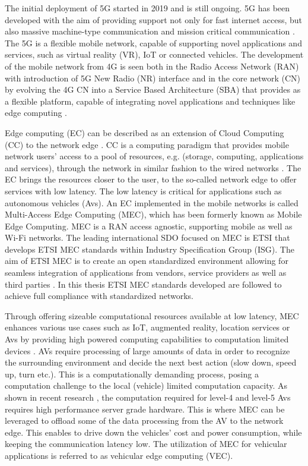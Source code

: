\documentclass[12pt,a4paper,twoside]{report}
\begin{document}
The initial deployment of 5G started in 2019 and is still ongoing. 5G has been developed with the aim of providing support not only for fast internet access, but also massive machine-type communication and mission critical communication \cite{dahlman-2020-5g}. The 5G is a flexible mobile network, capable of supporting novel applications and services, such as virtual reality (VR), IoT or connected vehicles. The development of the mobile network from 4G is seen both in the Radio Access Network (RAN) with introduction of 5G New Radio (NR) interface and in the core network (CN) by evolving the 4G CN into a Service Based Architecture (SBA) that provides as a flexible platform, capable of integrating novel applications and techniques like edge computing \cite{sabella-mec-sw-dev}. 

Edge computing (EC) can be described as an extension of Cloud Computing (CC) to the network edge \cite{sabella-mec-sw-dev}. CC is a computing paradigm that provides mobile network users’ access to a pool of resources, e.g. (storage, computing, applications and services), through the network in similar fashion to the wired networks \cite{mell2011nistCC}. The EC brings the resources closer to the user, to the so-called network edge to offer services with low latency. The low latency is critical for applications such as autonomous vehicles (Avs). An EC implemented in the mobile networks is called Multi-Access Edge Computing (MEC), which has been formerly known as Mobile Edge Computing. MEC is a RAN access agnostic, supporting mobile as well as Wi-Fi networks. The leading international SDO focused on MEC is ETSI that develops ETSI MEC standards within Industry Specification Group (ISG). The aim of ETSI MEC is to create an open standardized environment allowing for seamless integration of applications from vendors, service providers as well as third parties \cite{mec-etsi-web}. In this thesis ETSI MEC standards developed are followed to achieve full compliance with standardized networks. 

Through offering sizeable computational resources available at low latency, MEC enhances various use cases such as IoT, augmented reality, location services or Avs by providing high powered computing capabilities to computation limited devices \cite{mec-etsi-web}. AVs require processing of large amounts of data in order to recognize the surrounding environment and decide the next best action (slow down, speed up, turn etc.). This is a computationally demanding process, posing a computation challenge to the local (vehicle) limited computation capacity. As shown in recent research \cite{zhao2019towards}, the computation required for level-4 and level-5 Avs requires high performance server grade hardware. This is where MEC can be leveraged to offload some of the data processing from the AV to the network edge. This enables to drive down the vehicles’ cost and power consumption, while keeping the communication latency low. The utilization of MEC for vehicular applications is referred to as vehicular edge computing (VEC). 
\end{document}
